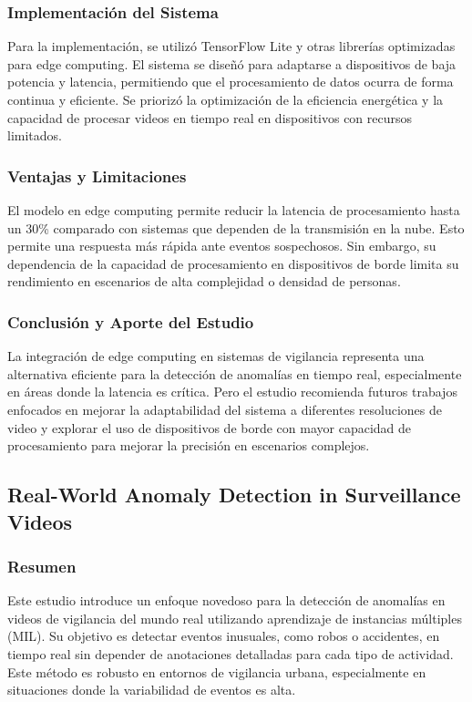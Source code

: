 \subsubsection{Implementación del Sistema}
Para la implementación, se utilizó TensorFlow Lite y otras librerías optimizadas para edge computing. El sistema se diseñó para adaptarse a dispositivos de baja potencia y latencia, permitiendo que el procesamiento de datos ocurra de forma continua y eficiente. Se priorizó la optimización de la eficiencia energética y la capacidad de procesar videos en tiempo real en dispositivos con recursos limitados.


\subsubsection{Ventajas y Limitaciones}
El modelo en edge computing permite reducir la latencia de procesamiento hasta un 30\% comparado con sistemas que dependen de la transmisión en la nube. Esto permite una respuesta más rápida ante eventos sospechosos. Sin embargo, su dependencia de la capacidad de procesamiento en dispositivos de borde limita su rendimiento en escenarios de alta complejidad o densidad de personas.


\subsubsection{Conclusión y Aporte del Estudio}
La integración de edge computing en sistemas de vigilancia representa una alternativa eficiente para la detección de anomalías en tiempo real, especialmente en áreas donde la latencia es crítica. Pero el estudio recomienda futuros trabajos enfocados en mejorar la adaptabilidad del sistema a diferentes resoluciones de video y explorar el uso de dispositivos de borde con mayor capacidad de procesamiento para mejorar la precisión en escenarios complejos.





\subsection{Real-World Anomaly Detection in Surveillance Videos}

\subsubsection{Resumen}
Este estudio introduce un enfoque novedoso para la detección de anomalías en videos de vigilancia del mundo real utilizando aprendizaje de instancias múltiples (MIL). Su objetivo es detectar eventos inusuales, como robos o accidentes, en tiempo real sin depender de anotaciones detalladas para cada tipo de actividad. Este método es robusto en entornos de vigilancia urbana, especialmente en situaciones donde la variabilidad de eventos es alta. 

